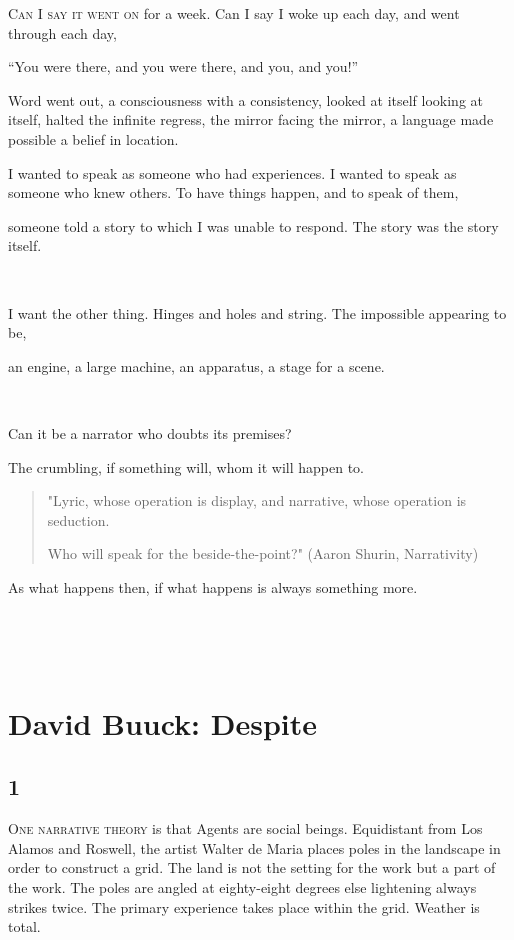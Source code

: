 \documentclass[
]{memoir}
\begin{document}
\lettrine[lines=3, findent=0em, nindent=0.1em, lhang=0]{C}{an I say it went on}
for a week. Can I say I woke up each day, and went through each day,

``You were there, and you were there, and you, and you!''

Word went out, a consciousness with a consistency, looked at itself
looking at itself, halted the infinite regress, the mirror facing the
mirror, a language made possible a belief in location.

I wanted to speak as someone who had experiences. I wanted to speak as
someone who knew others. To have things happen, and to speak of them,

someone told a story to which I was unable to respond. The story was the
story itself.

~

I want the other thing. Hinges and holes and string. The impossible
appearing to be,

an engine, a large machine, an apparatus, a stage for a scene.

~

Can it be a narrator who doubts its premises?

The crumbling, if something will, whom it will happen to.

\begin{quote}
"Lyric, whose operation is display, and narrative, whose operation is
seduction.

Who will speak for the beside-the-point?" (Aaron Shurin, Narrativity)
\end{quote}

As what happens then, if what happens is always something more.

~

~

\hypertarget{david-buuck-despite}{%
\chapter{David Buuck: Despite}\label{david-buuck-despite}}

\hypertarget{section-2}{%
\section*{1}\label{section-2}}

\lettrine[lines=3, findent=0em, nindent=0.1em, lhang=0]{O}{ne narrative theory}
is that Agents are social beings. Equidistant from Los Alamos and
Roswell, the artist Walter de Maria places poles in the landscape in
order to construct a grid. The land is not the setting for the work but
a part of the work. The poles are angled at eighty-eight degrees else
lightening always strikes twice. The primary experience takes place
within the grid. Weather is total.
\end{document}
